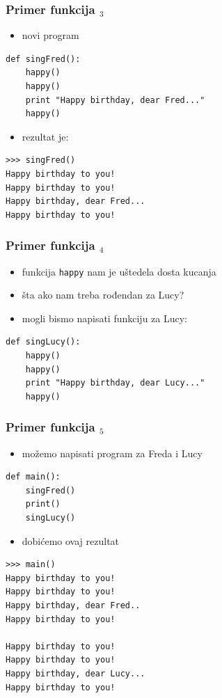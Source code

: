 \documentclass[compress]{beamer}
\begin{document}
\begin{frame}[fragile]
  \frametitle{Primer funkcija $_3$}
  \begin{itemize}
    \item novi program
  \end{itemize}
\begin{verbatim}
def singFred():
    happy()
    happy()
    print "Happy birthday, dear Fred..."
    happy()
\end{verbatim}
  \begin{itemize}
    \item rezultat je:
  \end{itemize}
\begin{verbatim}
>>> singFred()
Happy birthday to you!
Happy birthday to you!
Happy birthday, dear Fred...
Happy birthday to you!
\end{verbatim}
\end{frame}

\begin{frame}[fragile]
  \frametitle{Primer funkcija $_4$}
  \begin{itemize}
    \item funkcija \texttt{happy} nam je uštedela dosta kucanja
    \item šta ako nam treba rođendan za Lucy?
    \item mogli bismo napisati funkciju za Lucy:
  \end{itemize}
\begin{verbatim}
def singLucy():
    happy()
    happy()
    print "Happy birthday, dear Lucy..."
    happy()
\end{verbatim}
\end{frame}

\begin{frame}[fragile,shrink=10]
  \frametitle{Primer funkcija $_5$}
  \begin{itemize}
    \item možemo napisati program za Freda i Lucy
  \end{itemize}
\begin{verbatim}
def main():
    singFred()
    print()
    singLucy()
\end{verbatim}
  \begin{itemize}
    \item dobićemo ovaj rezultat
  \end{itemize}
\begin{verbatim}
>>> main()
Happy birthday to you!
Happy birthday to you!
Happy birthday, dear Fred..
Happy birthday to you!

Happy birthday to you!
Happy birthday to you!
Happy birthday, dear Lucy...
Happy birthday to you!
\end{verbatim}
\end{frame}
\end{document}
